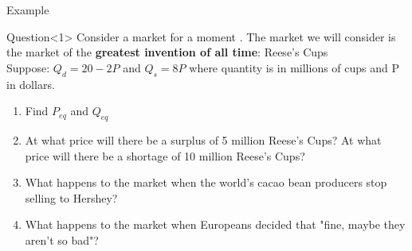 \documentclass{beamer}
\begin{document}
\begin{frame}{Example}
\begin{block}{Question}<1>
    Consider a market for a moment . The market we will consider is the market of the \textbf{greatest invention of all time}: Reese's Cups
    \vspace{2mm}
    \\Suppose:
    $Q_d = 20 - 2P$ and $Q_s =  8P$ where quantity is in millions of cups and P in dollars.
    \begin{enumerate}
        \item Find $P_{eq}$ and $Q_{eq}$
        \item At what price will there be a surplus of 5 million Reese's Cups?  At what price will there be a shortage of 10 million Reese's Cups?
        \item What happens to the market when the world's cacao bean producers stop selling to Hershey?
        \item What happens to the market when Europeans decided that "fine, maybe they aren't so bad"?
    \end{enumerate}
\end{block}

\end{frame}
\end{document}
